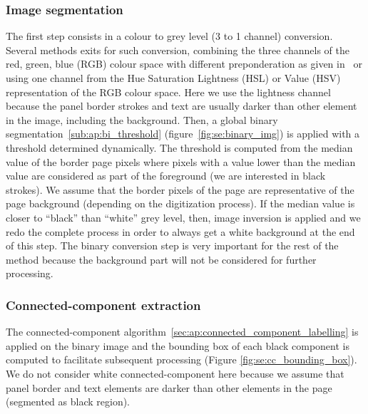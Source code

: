 \subsubsection{Image segmentation} %
\label{par:se:image_segmentation}

The first step consists in a colour to grey level (3 to 1 channel) conversion.
Several methods exits for such conversion, combining the three channels of the red, green, blue (RGB) colour space with different preponderation as given in~\cite{Pratt91} or using one channel from the Hue Saturation Lightness (HSL) or Value (HSV) representation of the RGB colour space.
Here we use the lightness channel because the panel border strokes and text are usually darker than other element in the image, including the background. 
Then, a global binary segmentation~\ref{sub:ap:bi_threshold} (figure~\ref{fig:se:binary_img}) is applied with a threshold determined dynamically.
The threshold is computed from the median value of the border page pixels where pixels with a value lower than the median value are considered as part of the foreground (we are interested in black strokes).
We assume that the border pixels of the page are representative of the page background (depending on the digitization process).
If the median value is closer to ``black'' than ``white'' grey level, then, image inversion is applied and we redo the complete process in order to always get a white background at the end of this step.
The binary conversion step is very important for the rest of the method because the background part will not be considered for further processing. %


\subsubsection{Connected-component extraction} %
 \label{par:connected_component_extraction}
 
The connected-component algorithm~\ref{sec:ap:connected_component_labelling} is applied on the binary image and the bounding box of each black component is computed to facilitate subsequent processing (Figure \ref{fig:se:cc_bounding_box}).
We do not consider white connected-component here because we assume that panel border and text elements are darker than other elements in the page (segmented as black region).

